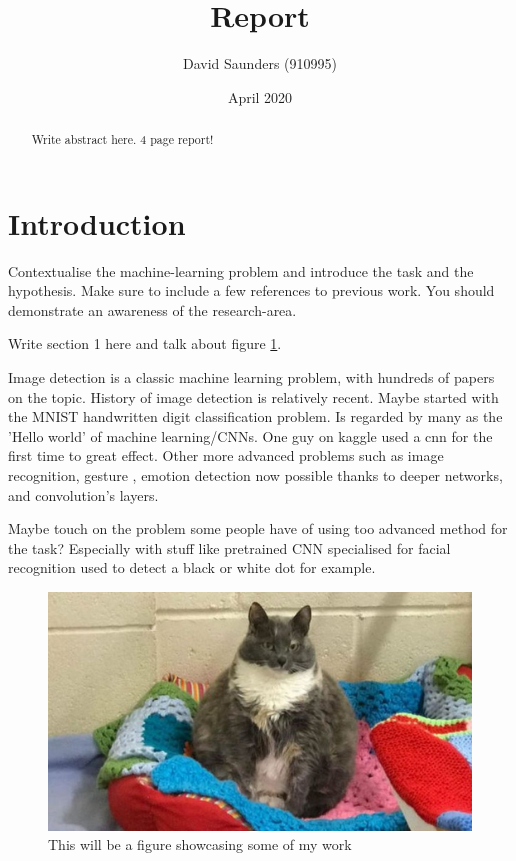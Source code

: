 \documentclass{article}
\title{Report}
\author{David Saunders (910995)}
\date{April 2020}
\begin{document}
\maketitle

\begin{abstract} 
    Write abstract here. 4 page report!
\end{abstract}

\tableofcontents

\section{Introduction}

Contextualise the machine-learning problem and introduce the
task and the hypothesis. Make sure to include a few references to previous
work. You should demonstrate an awareness of the research-area.

Write section 1 here \cite{torsney2011tuner} and talk about figure \ref{fig:test}.

Image detection is a classic machine learning problem, with hundreds of papers on the topic. 
History of image detection is relatively recent.
Maybe started with the MNIST handwritten digit classification problem.
Is regarded by many as the 'Hello world' of machine learning/CNNs.
One guy on kaggle used a cnn for the first time to great effect.
Other more advanced problems such as image recognition, gesture
    , emotion detection now possible thanks to deeper networks, and convolution's layers.


Maybe touch on the problem some people have of using too advanced method for the task?
Especially with stuff like pretrained CNN specialised for facial recognition used to detect a black or white dot for example.


\begin{figure}[ht]
    \centering
    \includegraphics[scale=0.35]{Test.JPG}
    \caption{This will be a figure showcasing some of my work}
    \label{fig:test}
\end{figure}
\end{document}
